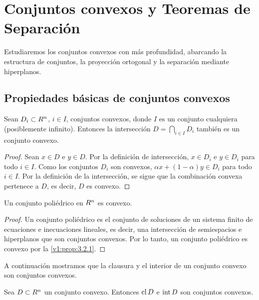 
\section{Conjuntos convexos y Teoremas de Separación}
\label{v1:sec:3.2}

Estudiaremos los conjuntos convexos con más profundidad, abarcando la estructura de conjuntos, la proyección ortogonal y la separación mediante hiperplanos.

\subsection{Propiedades básicas de conjuntos convexos}

\begin{proposition}\label{v1:prop:3.2.1}
 Sean $D_i \subset R^n$, $i \in I$, conjuntos convexos, donde $I$ es un conjunto cualquiera (posiblemente infinito). Entonces la intersección $D = \bigcap_{i\in I} D_i$ también es un conjunto convexo.
\end{proposition}

\begin{proof}
 Sean $x \in D$ e $y \in D$. Por la definición de intersección, $x \in D_i$ e $y \in D_i$ para todo $i \in I$. Como los conjuntos $D_i$ son convexos, $\alpha x + (1 - \alpha)y \in D_i$ para todo $i \in I$. Por la definición de la intersección, se sigue que la combinación convexa pertenece a $D$, es decir, $D$ es convexo.
\end{proof}

\begin{corollary}\label{v1:cor:3.2.1}
 Un conjunto poliédrico en $R^n$ es convexo.
\end{corollary}

\begin{proof}
 Un conjunto poliédrico es el conjunto de soluciones de un sistema finito de ecuaciones e inecuaciones lineales, es decir, una intersección de semiespacios e hiperplanos que son conjuntos convexos. Por lo tanto, un conjunto poliédrico es convexo por la \cref{v1:prop:3.2.1}.
\end{proof}

A continuación mostramos que la clausura y el interior de un conjunto convexo son conjuntos convexos.

\begin{proposition}\label{v1:prop:3.2.2}
 Sea $D \subset R^n$ un conjunto convexo. Entonces $\operatorname{cl} D$ e $\operatorname{\operatorname{int}} D$ son conjuntos convexos.
\end{proposition}

